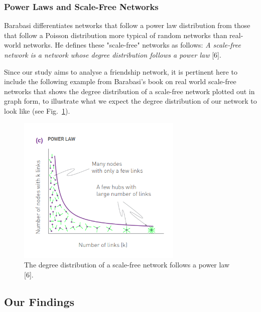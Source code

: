 \documentclass[runningheads]{llncs}
\begin{document}
\subsubsection{Power Laws and Scale-Free Networks}
Barabasi differentiates networks that follow a power law distribution from those that follow a Poisson distribution more typical of random networks than real-world networks. He defines these "scale-free" networks as follows: \textit{A scale-free network is a network whose degree distribution follows a power
law} [6].

Since our study aims to analyse a friendship network, it is pertinent here to include the following example from Barabasi's book on real world scale-free networks that shows the degree distribution of a scale-free network plotted out in graph form, to illustrate what we expect the degree distribution of our network to look like (see Fig.~\ref{fig1}).
\begin{figure}
\begin{center}
\includegraphics[width=0.7\textwidth]{Project/barabasi.png}
\caption{The degree distribution of a scale-free network follows a power law [6].} \label{fig1}
\end{center}
\end{figure}
\FloatBarrier

\newpage
\subsection{Our Findings}
\end{document}
